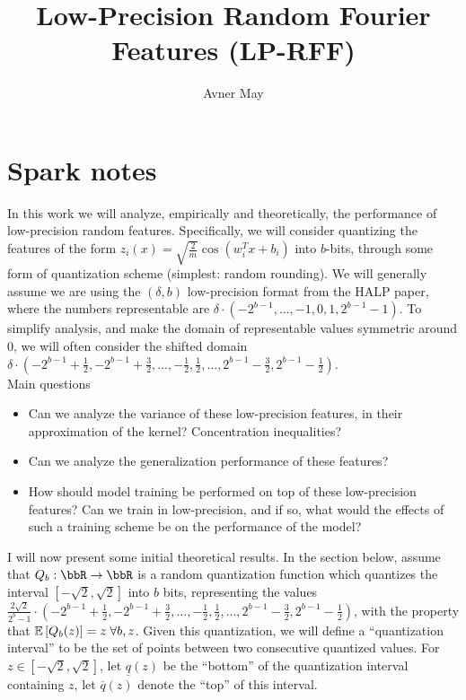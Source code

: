 \documentclass[12pt]{article}
\newcommand{\sq}{\sqrt{2}}
\newcommand{\ulq}{\underline{q}}
\newcommand{\olq}{\overline{q}}
\begin{document}
\title{Low-Precision Random Fourier Features (LP-RFF)}
\author{Avner May}
\onehalfspacing
\maketitle

\section{Spark notes}
In this work we will analyze, empirically and theoretically, the performance of low-precision random features.  Specifically, we will consider quantizing the features of the form $z_i(x) = \sqrt{\frac{2}{m}} \cos(w_i^Tx+b_i)$ into $b$-bits, through some form of quantization scheme (simplest: random rounding).  We will generally assume we are using the $(\delta,b)$ low-precision format from the HALP paper, where the numbers representable are $\delta\cdot (-2^{b-1},\ldots,-1,0,1,2^{b-1}-1)$.  To simplify analysis, and make the domain of representable values symmetric around 0, we will often consider the shifted domain $\delta \cdot (-2^{b-1} + \frac{1}{2}, -2^{b-1} + \frac{3}{2},\ldots, -\frac{1}{2},\frac{1}{2},\ldots, 2^{b-1}-\frac{3}{2}, 2^{b-1}-\frac{1}{2})$.  \\

\noindent Main questions
\begin{itemize}
	\item Can we analyze the variance of these low-precision features, in their approximation of the kernel?  Concentration inequalities?
	\item Can we analyze the generalization performance of these features?
	\item How should model training be performed on top of these low-precision features? Can we train in low-precision, and if so, what would the effects of such a training scheme be on the performance of the model?
\end{itemize}

I will now present some initial theoretical results.  In the section below, assume that $Q_b:\RR\rightarrow\RR$ is a random quantization function which quantizes the interval $[-\sq,\sq]$ into $b$ bits, representing the values $\frac{2\sq}{2^b-1} \cdot (-2^{b-1} + \frac{1}{2}, -2^{b-1} + \frac{3}{2},\ldots, -\frac{1}{2},\frac{1}{2},\ldots, 2^{b-1}-\frac{3}{2}, 2^{b-1}-\frac{1}{2})$, with the property that $\expect{}{Q_b(z)} = z \; \forall b,z$.  Given this quantization, we will define a ``quantization interval'' to be the set of points between two consecutive quantized values.
For $z\in [-\sq,\sq]$, let $\ulq(z)$ be the ``bottom'' of the quantization interval containing $z$, let $\olq(z)$ denote the ``top'' of this interval.
\end{document}
